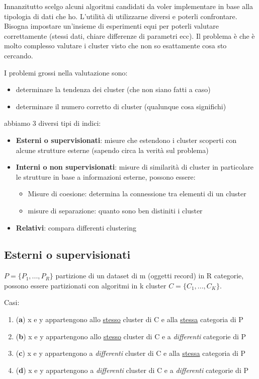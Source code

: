 Innanzitutto scelgo alcuni algoritmi candidati da voler implementare in base alla tipologia di dati che ho. L'utilit\`a di utilizzarne diversi e poterli confrontare. Bisogna impostare un'insieme di esperimenti equi per poterli valutare correttamente (stessi dati, chiare differenze di parametri ecc). 
Il problema \`e che \`e molto complesso valutare i cluster visto che non so esattamente cosa sto cercando. 

I problemi grossi nella valutazione sono:
\begin{itemize}
	\item determinare la tendenza dei cluster (che non siano fatti a caso)
	\item determinare il numero corretto di cluster (qualunque cosa significhi)
\end{itemize} 

abbiamo 3 diversi tipi di indici:
\begin{itemize}
	\item \textbf{Esterni o supervisionati}: misure che estendono i cluster scoperti con alcune strutture esterne (sapendo circa la verit\`a sul problema)
	\item \textbf{Interni o non supervisionati}: misure di similarit\`a di cluster in particolare le strutture in base a informazioni esterne, possono essere:
	\begin{itemize}
		\item Misure di coesione: determina la connessione tra elementi di un cluster
		\item misure di separazione: quanto sono ben distiniti i cluster 
	\end{itemize}
	\item \textbf{Relativi}: compara differenti clustering
\end{itemize}

\subsection{Esterni o supervisionati}
$P = \{P_1, ..., P_R\}$ partizione di un dataset di m (oggetti record) in R categorie, possono essere partizionati con algoritmi in k cluster $C= \{C_1, ..., C_K\}$.

Casi:
\begin{enumerate}
	\item (\textbf{a}) x e y appartengono allo \underline{stesso} cluster di C e alla \underline{stessa} categoria di P
	\item (\textbf{b}) x e y appartengono allo \underline{stesso} cluster di C e a \textit{differenti} categorie di P
	\item (\textbf{c}) x e y appartengono a \textit{differenti} cluster di C e alla \underline{stessa} categoria di P
	\item (\textbf{d}) x e y appartengono a \textit{differenti} cluster di C e a \textit{differenti} categorie di P
\end{enumerate}


